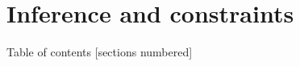 \documentclass[aspectratio=169,dvipsnames,svgnames,10pt]{beamer}
\begin{document}
\section{Inference and constraints}

\begin{frame}{Table of contents}
  [sections numbered]
\end{frame}





\end{document}
